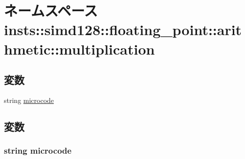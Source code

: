 \hypertarget{namespaceinsts_1_1simd128_1_1floating__point_1_1arithmetic_1_1multiplication}{
\section{ネームスペース insts::simd128::floating\_\-point::arithmetic::multiplication}
\label{namespaceinsts_1_1simd128_1_1floating__point_1_1arithmetic_1_1multiplication}
}
\subsection*{変数}
\begin{DoxyCompactItemize}
\item 
string \hyperlink{namespaceinsts_1_1simd128_1_1floating__point_1_1arithmetic_1_1multiplication_a770f11a173e99389a8802f0107ed8f52}{microcode}
\end{DoxyCompactItemize}


\subsection{変数}
\hypertarget{namespaceinsts_1_1simd128_1_1floating__point_1_1arithmetic_1_1multiplication_a770f11a173e99389a8802f0107ed8f52}{
\subsubsection[{microcode}]{\setlength{\rightskip}{0pt plus 5cm}string {\bf microcode}}}
\label{namespaceinsts_1_1simd128_1_1floating__point_1_1arithmetic_1_1multiplication_a770f11a173e99389a8802f0107ed8f52}
